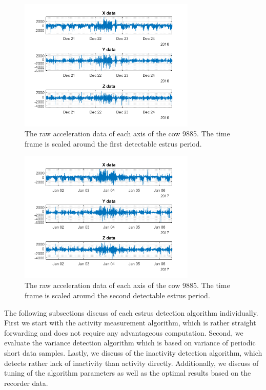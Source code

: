 \documentclass[english,12pt,a4paper,pdftex,elec,utf8]{aaltothesis}
\begin{document}
\begin{figure}[htb]
\centering
\includegraphics[width = 0.75\textwidth]{figures/kiimadata_9885_1.png}
\caption{The raw acceleration data of each axis of the cow 9885. The time frame is scaled around the first detectable estrus period. }
\label{kiimadata_9885_1}
\end{figure}

\begin{figure}[htb]
\centering
\includegraphics[width = 0.75\textwidth]{figures/kiimadata_9885_2.png}
\caption{The raw acceleration data of each axis of the cow 9885. The time frame is scaled around the second detectable estrus period. }
\label{kiimadata_9885_2}
\end{figure}


The following subsections discuss of each estrus detection algorithm individually. First we start with the activity measurement algorithm, which is rather straight forwarding and does not require any advantageous computation. Second, we evaluate the variance detection algorithm which is based on variance of periodic short data samples. Lastly, we discuss of the inactivity detection algorithm, which detects rather lack of inactivity than activity directly. Additionally, we discuss of tuning of the algorithm parameters as well as the optimal results based on the recorder data. 
\end{document}
